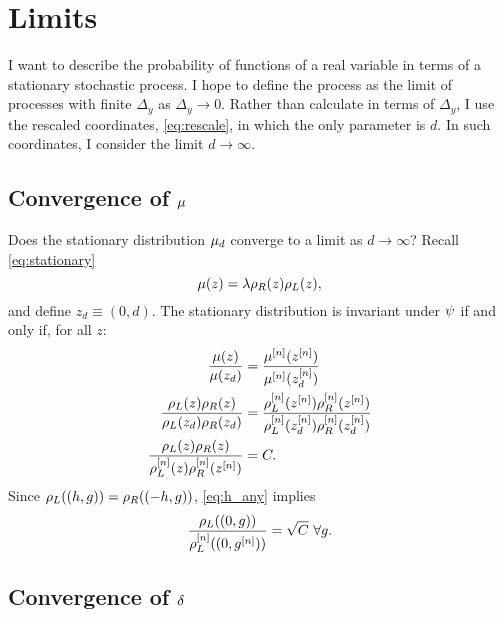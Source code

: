\documentclass[twocolumn]{article}
\begin{document}
\section{Limits}
\label{sec:limist}

I want to describe the probability of functions of a real variable in
terms of a stationary stochastic process.  I hope to define the
process as the limit of processes with finite $\Delta_y$ as
$\Delta_y \rightarrow 0$.  Rather than calculate in terms of
$\Delta_y$, I use the rescaled coordinates, \eqref{eq:rescale}, in
which the only parameter is $d$.  In such coordinates, I consider the
limit $d \rightarrow \infty$.

\subsection{Convergence of $\mu$}
\label{sec:convergence}

Does the stationary distribution $\mu_d$ converge to a limit
as $d \rightarrow \infty$?
Recall \eqref{eq:stationary}
\begin{equation*}
  \mu(z) = \lambda \rho_R(z) \rho_L(z),
\end{equation*}
and define $z_d \equiv (0,d)$.  The stationary distribution is
invariant under $\psi_{}$ if and only if, for all $z$:
\begin{align}
  \frac{\stationary(z)}{\stationary(z_d)} &=
  \frac{\stationary\supn(z\supn)}{\stationary\supn(z\supn_d)} \nonumber\\
%
  \frac{\lefunc(z)\refunc(z)}{\lefunc(z_d)\refunc(z_d)} &=
  \frac{\lefunc\supn(z\supn)\refunc\supn(z\supn)}{\lefunc\supn(z_d\supn)\refunc\supn(z_d\supn)}
  \nonumber \\ 
  \label{eq:h_any}
  \frac{\lefunc(z)\refunc(z)}{\lefunc\supn(z)\refunc\supn(z\supn)} &= C.
\end{align}
Since $\rho_L((h,g)) = \rho_R((-h,g))$, \eqref{eq:h_any} implies
\begin{equation}
  \label{eq:h_zero}
  \frac{\rho_L((0,g))}{\rho_L^{[n]}((0,g^{[n]}))} = \sqrt{C} ~\forall g.
\end{equation}

\subsection{Convergence of $\delta_{}$}
\label{sec:convergence_joint}
\end{document}
